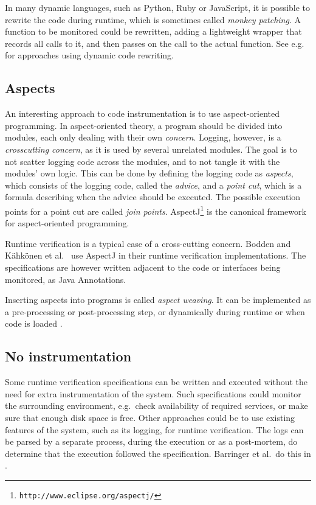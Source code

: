 In many dynamic languages, such as Python, Ruby or JavaScript, it is possible
to rewrite the code during runtime, which is sometimes called \textit{monkey
patching}. A function to be monitored could be rewritten, adding a lightweight
wrapper that records all calls to it, and then passes on the call to the actual
function. See e.g.\ \cite{matusiak09aoppy} for approaches using dynamic code
rewriting.


\subsection{Aspects} \label{section-aspects}

An interesting approach to code instrumentation is to use aspect-oriented
programming. In aspect-oriented theory, a program should be divided into
modules, each only dealing with their own \textit{concern}. Logging, however,
is a \textit{crosscutting concern}, as it is used by several unrelated modules.
The goal is to not scatter logging code across the modules, and to not tangle
it with the modules' own logic. This can be done by defining the logging code
as \textit{aspects}, which consists of the logging code, called the
\textit{advice}, and a \textit{point cut}, which is a formula describing when
the advice should be executed. The possible execution points for a point cut
are called \textit{join points}.
AspectJ\footnote{\texttt{http://www.eclipse.org/aspectj/}} is the canonical
framework for aspect-oriented programming.

Runtime verification is a typical case of a cross-cutting concern. Bodden
\cite{bodden05efficientrv} and Kähkönen et al.\ \cite{kahkonen09lime} use
AspectJ in their runtime verification implementations. The specifications are
however written adjacent to the code or interfaces being monitored, as Java
Annotations.

Inserting aspects into programs is called \textit{aspect weaving}. It can be
implemented as a pre-processing or post-processing step, or dynamically during
runtime or when code is loaded \cite{kiczales01aspect, matusiak09aoppy}.


\subsection{No instrumentation}

Some runtime verification specifications can be written and executed without
the need for extra instrumentation of the system. Such specifications could
monitor the surrounding environment, e.g.\ check availability of required
services, or make sure that enough disk space is free. Other approaches could be
to use existing features of the system, such as its logging, for runtime
verification. The logs can be parsed by a separate process, during the
execution or as a post-mortem, do determine that the execution followed the
specification. Barringer et al.\ do this in \cite{barringer09tutorial}.

